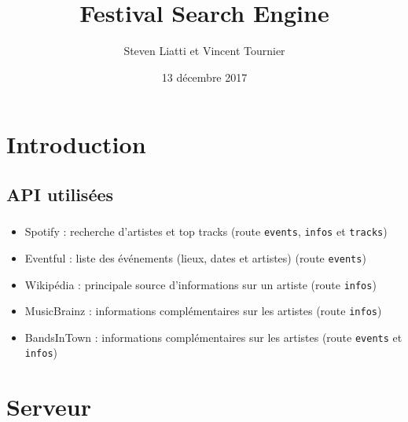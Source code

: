 \documentclass{beamer}
\begin{document}

\title{Festival Search Engine}
\author{Steven Liatti et Vincent Tournier}
\date{13 décembre 2017}

\begin{frame}
\titlepage
\end{frame}

\begin{frame}
	\setcounter{tocdepth}{3}
	\tableofcontents
\end{frame}

\section{Introduction}
\subsection{API utilisées}
\begin{frame}
	\frametitle{\secname}
	\framesubtitle{\subsecname}
	\begin{itemize}
		\item Spotify : recherche d'artistes et top tracks (route \texttt{events}, \texttt{infos} et \texttt{tracks})
		\item Eventful : liste des événements (lieux, dates et artistes) (route \texttt{events})
		\item Wikipédia : principale source d'informations sur un artiste (route \texttt{infos})
        \item MusicBrainz : informations complémentaires sur les artistes (route \texttt{infos})
		\item BandsInTown : informations complémentaires sur les artistes (route \texttt{events} et \texttt{infos})
	\end{itemize}
\end{frame}

\section{Serveur}
\end{document}
